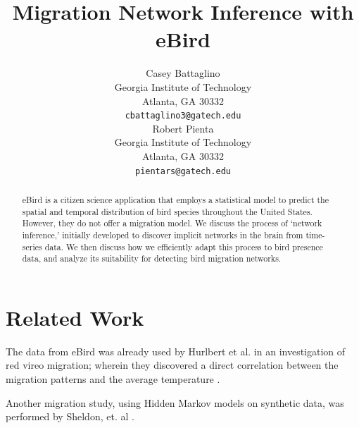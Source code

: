 \documentclass{article} %
\title{Migration Network Inference with eBird}
\author{
Casey Battaglino \\
Georgia Institute of Technology\\
Atlanta, GA 30332 \\
\texttt{cbattaglino3@gatech.edu} \\
\And
Robert Pienta \\
Georgia Institute of Technology \\
Atlanta, GA 30332 \\
\texttt{pientars@gatech.edu} \\
}
\begin{document}
\maketitle

\begin{abstract}
eBird is a citizen science application that employs a statistical model to predict the spatial and temporal distribution of bird species throughout the United States. However, they do not offer a migration model. We discuss the process of `network inference,' initially developed to discover implicit networks in the brain from time-series data. We then discuss how we efficiently adapt this process to bird presence data, and analyze its suitability for detecting bird migration networks. 
\end{abstract}













\section{Related Work}
The data from eBird was already used by Hurlbert et al. in an investigation of red vireo migration; wherein they discovered a direct correlation between the migration patterns and the average temperature \cite{hurlbert}. 

Another migration study, using Hidden Markov models on synthetic data, was performed by Sheldon, et. al \cite{conf/nips/SheldonEK07}. 

\appendix
\end{document}

